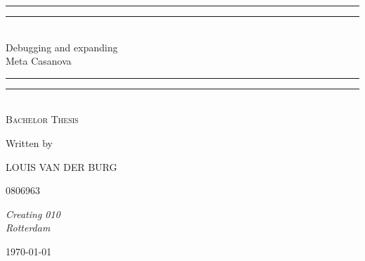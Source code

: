 \newcommand*{\titleGP}{\begingroup %
\centering %
\vspace*{\baselineskip} %

\rule{\textwidth}{1.6pt}\vspace*{-\baselineskip}\vspace*{2pt} %
\rule{\textwidth}{0.4pt}\\[0.5\baselineskip] %

{\LARGE Debugging and expanding \\ [0.4\baselineskip] Meta Casanova }\\[0.2\baselineskip] %

\rule{\textwidth}{0.4pt}\vspace*{-\baselineskip}\vspace{3.2pt} %
\rule{\textwidth}{1.6pt}\\[\baselineskip] %

\scshape %
Bachelor Thesis\\[\baselineskip] %

\vspace*{3\baselineskip} %

Written by \\[0.3\baselineskip]
{\Large LOUIS VAN DER BURG \par} %
{\small 0806963 } \\[0.3\baselineskip] %
{\itshape Creating 010 \\ Rotterdam\par} %

\vspace*{1.5\baselineskip} %

\vfill %

{\scshape \today} \\[0.3\baselineskip] %

\endgroup}


%


\titleGP %

%
